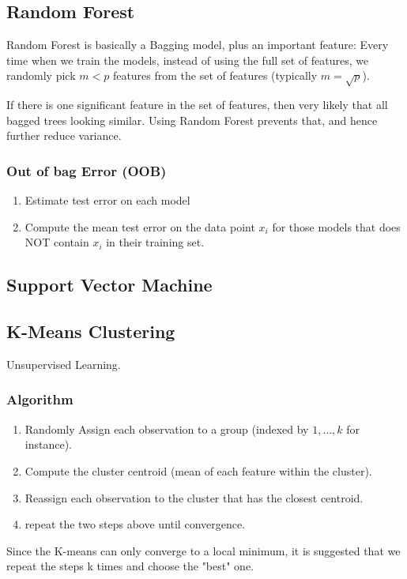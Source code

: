 \documentclass[12pt]{amsart}
\numberwithin{equation}{section}
\theoremstyle{plain}
\theoremstyle{definition}
\begin{document}
\subsection{Random Forest}
Random Forest is basically a Bagging model, plus an important feature: Every time when we train the models, instead of using the full set of features, we randomly pick $m<p$ features from the set of features (typically $m = \sqrt{p}$).

If there is one significant feature in the set of features, then very likely that all bagged trees looking similar. Using Random Forest prevents that, and hence further reduce variance.

\subsubsection{Out of bag Error (OOB)}
\begin{enumerate}
\item Estimate test error on each model
\item Compute the mean test error on the data point $x_i$ for those models that does NOT contain $x_i$ in their training set.
\end{enumerate}

\subsection{Support Vector Machine}

\subsection{K-Means Clustering}
Unsupervised Learning. 

\subsubsection{Algorithm}
\begin{enumerate}
\item Randomly Assign each observation to a group (indexed by $1,\ldots, k$ for instance).
\item Compute the cluster centroid (mean of each feature within the cluster).
\item Reassign each observation to the cluster that has the closest centroid.
\item repeat the two steps above until convergence.
\end{enumerate}
Since the K-means can only converge to a local minimum, it is suggested that we repeat the steps k times and choose the "best" one.
\end{document}
